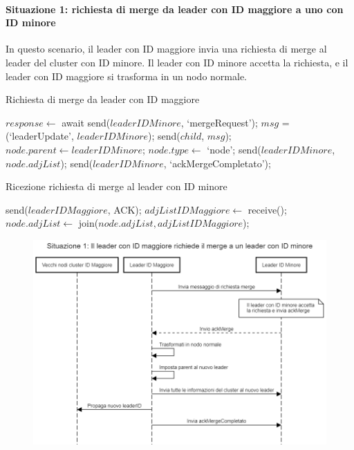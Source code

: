 \documentclass[12pt, a4paper]{report}
\begin{document}
\newpage
\paragraph{Situazione 1: richiesta di merge da leader con ID maggiore a uno con ID minore}
In questo scenario, il leader con ID maggiore invia una richiesta di merge al leader del cluster con ID minore. Il leader con ID minore accetta la richiesta, e il leader con ID maggiore si trasforma in un nodo normale. 

\vspace{-5pt}
\begin{algorithm}[H]
\caption{Richiesta di merge da leader con ID maggiore}
\begin{algorithmic}[1]
    \State $response \gets$ await send($leaderIDMinore$, `mergeRequest');
        \State $msg$ = (`leaderUpdate', $leaderIDMinore$);
            \State send($child$, $msg$);
        \EndFor      
        \State $node.parent \gets leaderIDMinore$;
        \State $node.type \gets$ `node';
        \State send($leaderIDMinore$, $node.adjList$);
        \State send($leaderIDMinore$, `ackMergeCompletato');
    \EndIf
\EndProcedure
\end{algorithmic}
\end{algorithm}

\vspace{-15pt}
\begin{algorithm}[H]
\caption{Ricezione richiesta di merge al leader con ID minore}
\begin{algorithmic}[1]
        \State send($leaderIDMaggiore$, ACK);
        \State $adjListIDMaggiore \gets$ receive();
        \State $node.adjList \gets$ join($node.adjList, adjListIDMaggiore$);
    \EndIf
\EndProcedure
\end{algorithmic}
\end{algorithm}

\vspace{-10pt}
\begin{figure}[H]
    \centering
    \includegraphics[width=0.85\linewidth]{images/Situazione1.png}
\end{figure}
\end{document}
